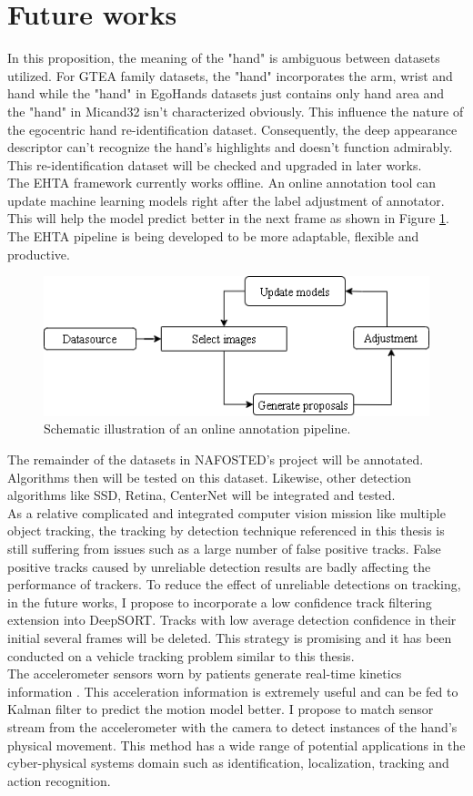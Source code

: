 \section{Future works}
In this proposition, the meaning of the "hand" is ambiguous between datasets utilized. For GTEA family datasets, the "hand" incorporates the arm, wrist and hand while the "hand" in EgoHands datasets just contains only hand area and the "hand" in Micand32 isn't characterized obviously. This influence the nature of the egocentric hand re-identification dataset. Consequently, the deep appearance descriptor can't recognize the hand's highlights and doesn't function admirably. This re-identification dataset will be checked and upgraded in later works.
\\The EHTA framework currently works offline. An online annotation tool can update machine learning models right after the label adjustment of annotator. This will help the model predict better in the next frame as shown in Figure \ref{fig:future}. The EHTA pipeline is being developed to be more adaptable, flexible and productive. 
\begin{figure}[htbp]
	\centerline{\includegraphics[width=0.5\textheight]{Figs/future.png}}
	\caption{Schematic illustration of an online annotation pipeline.}
	\label{fig:future}
\end{figure}
The remainder of the datasets in NAFOSTED’s project will be annotated. Algorithms then will be tested on this dataset. Likewise, other detection algorithms like SSD, Retina, CenterNet will be integrated and tested.
\\As a relative complicated and integrated computer vision mission like multiple object tracking, the tracking by detection technique referenced in this thesis is still suffering from issues such as a large number of false positive tracks. False positive tracks caused by unreliable detection results are badly affecting the performance of trackers. To reduce the effect of unreliable detections on tracking, in the future works, I propose to incorporate a low confidence track filtering extension into DeepSORT. Tracks with low average detection confidence in their initial several frames will be deleted. This strategy is promising and it has been conducted on a vehicle tracking problem \cite{8909903} similar to this thesis.
\\The accelerometer sensors worn by patients generate real-time kinetics information \cite{4651201}. This acceleration information is extremely useful and can be fed to Kalman filter to predict the motion model better. I propose to match sensor stream from the accelerometer with the camera to detect instances of the hand’s physical movement. This method has a wide range of potential applications in the cyber-physical systems domain such as identification, localization, tracking and action recognition.